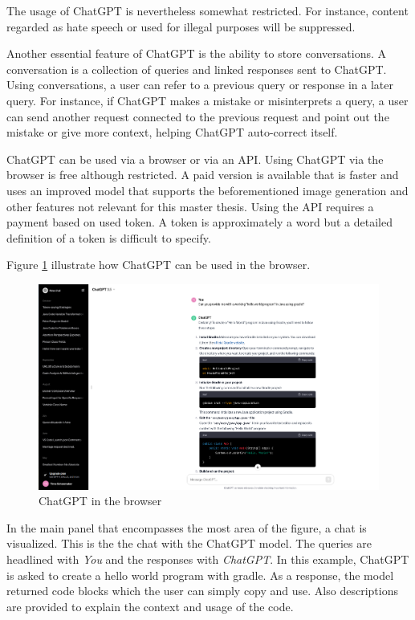 The usage of ChatGPT is nevertheless somewhat restricted. For instance, content regarded as hate speech or used for illegal purposes will be suppressed.

Another essential feature of ChatGPT is the ability to store conversations. A conversation is a collection of queries and linked responses sent to ChatGPT. Using conversations, a user can refer to a previous query or response in a later query. For instance, if ChatGPT makes a mistake or misinterprets a query, a user can send another request connected to the previous request and point out the mistake or give more context, helping ChatGPT auto-correct itself. 

ChatGPT can be used via a browser or via an API. Using ChatGPT via the browser is free although restricted. A paid version is available that is faster and uses an improved model that supports the beforementioned image generation and other features not relevant for this master thesis.  Using the API requires a payment based on used token. A token is approximately a word but a detailed definition of a token is difficult to specify. 

Figure \ref{fig:chatgpt_browser} illustrate how ChatGPT can be used in the browser.
\begin{figure}
    \centering
\includegraphics[width=\columnwidth]{figures/chapter2/chatgpt_browser.png}
    \caption{ChatGPT in the browser}
    \label{fig:chatgpt_browser}
\end{figure}
In the main panel that encompasses the most area of the figure, a chat is visualized. This is the the chat with the ChatGPT model. The queries are headlined with \textit{You} and the responses with \textit{ChatGPT}. In this example, ChatGPT is asked to create a hello world program with gradle. As a response, the model returned code blocks which the user can simply copy and use. Also descriptions are provided to explain the context and usage of the code.

